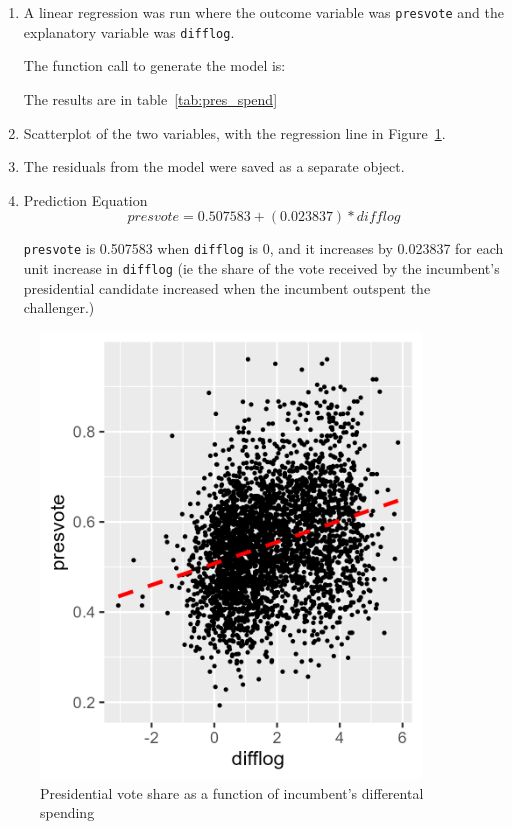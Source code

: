 \documentclass[12pt,letterpaper]{article}
\begin{document}
	\begin{enumerate}
		\item A linear regression was run where the outcome variable was  \texttt{presvote} and 
		the explanatory variable was \texttt{difflog}.	
		
      The function call to generate the model is:
	    

      The results are in table~\ref{tab:pres_spend}
		
		\item Scatterplot of the two variables, with the regression line in Figure~\ref{fig:pres_spend}.
		
		\item The residuals from the model were saved as a  separate object.	
    	
		
		\item Prediction Equation 
     \[presvote = 0.507583 + (0.023837) * difflog\]

       \texttt{presvote} is 0.507583 when \texttt{difflog} is 0, and it increases by 0.023837 
       for each unit increase in \texttt{difflog} (ie the share of the vote received by 
       the incumbent's presidential candidate increased when the incumbent outspent the 
       challenger.)

	\end{enumerate}

  

	    \begin{figure}
		    \includegraphics[width=0.9\textwidth]{Graphics/pres_spend.png}
		    \caption{Presidential vote share as a function of incumbent's differental spending}
		    \label{fig:pres_spend}
	    \end{figure}
\clearpage
\newpage	
\end{document}
